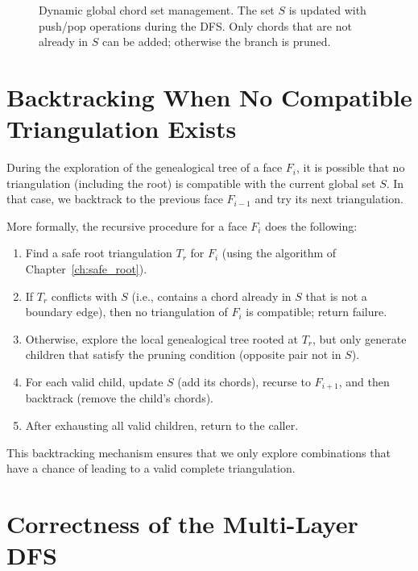 \begin{figure}[htbp]
    \caption{Dynamic global chord set management. The set \(S\) is updated with push/pop operations during the DFS. 
    Only chords that are not already in \(S\) can be added; otherwise the branch is pruned.}
    \label{fig:global_chord_management}
\end{figure}

\section{Backtracking When No Compatible Triangulation Exists}
\label{sec:backtracking}

During the exploration of the genealogical tree of a face \(F_i\), it is possible that no triangulation (including the root) is compatible with the current global set \(S\). 
In that case, we backtrack to the previous face \(F_{i-1}\) and try its next triangulation.

More formally, the recursive procedure for a face \(F_i\) does the following:
\begin{enumerate}
    \item Find a safe root triangulation \(T_r\) for \(F_i\) (using the algorithm of Chapter~\ref{ch:safe_root}).
    \item If \(T_r\) conflicts with \(S\) (i.e., contains a chord already in \(S\) that is not a boundary edge), then no triangulation of \(F_i\) is compatible; return failure.
    \item Otherwise, explore the local genealogical tree rooted at \(T_r\), but only generate children that satisfy the pruning condition (opposite pair not in \(S\)).
    \item For each valid child, update \(S\) (add its chords), recurse to \(F_{i+1}\), and then backtrack (remove the child’s chords).
    \item After exhausting all valid children, return to the caller.
\end{enumerate}

This backtracking mechanism ensures that we only explore combinations that have a chance of leading to a valid complete triangulation.

\section{Correctness of the Multi-Layer DFS}
\label{sec:multilayer_correctness}

